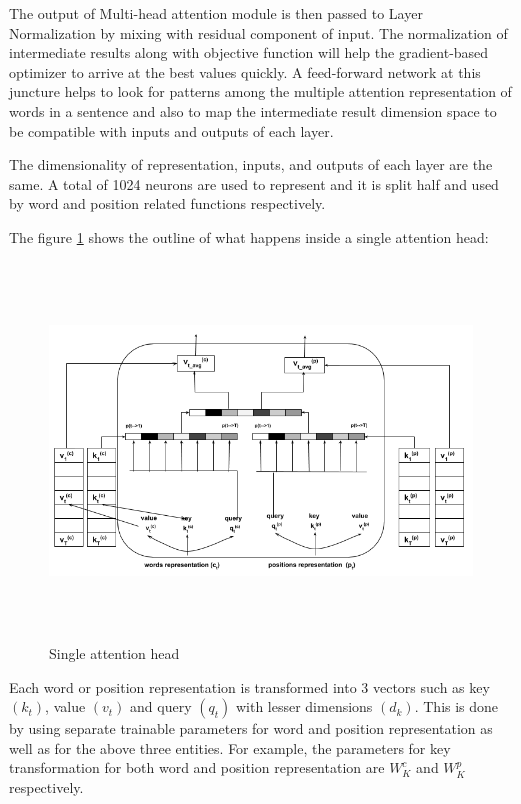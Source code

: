 \documentclass[a4paper, 11pt]{article}
\begin{document}
The output of Multi-head attention module is then passed to Layer Normalization by mixing with residual component of input. The normalization of intermediate results along with objective function will help the gradient-based optimizer to arrive at the best values quickly. A feed-forward network at this juncture helps to look for patterns among the multiple attention representation of words in a sentence and also to map the intermediate result dimension space to be compatible with inputs and outputs of each layer.  

The dimensionality of representation, inputs, and outputs of each layer are the same. A total of 1024 neurons are used to represent and it is split half and used by word and position related functions respectively. 


The figure \ref{fig:single_attention_head} shows the outline of what happens inside a single attention head:

\begin{figure}[htpb]
    \centering
    \includegraphics[width=\textwidth,height=10cm,keepaspectratio=true]
    {single-head-attention.png}
    \caption{
        Single attention head
    }
    \label{fig:single_attention_head}
\end{figure}


Each word or position representation is transformed into 3 vectors such as key $(k_t)$,  value $(v_t)$ and query $(q_t)$ with lesser dimensions $(d_k)$. This is done by using separate trainable parameters for word and position representation as well as for the above three entities. For example, the parameters for key transformation for both word and position representation are $W^{c}_K$ and $W^{p}_K$ respectively.
\end{document}
